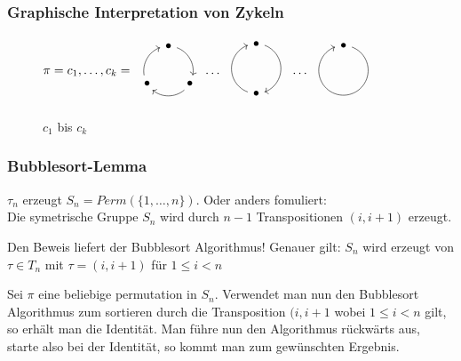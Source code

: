 \documentclass[12pt, german]{article}
\begin{document}
\subsubsection{Graphische Interpretation von Zykeln}
	\begin{figure}[h!]
		\centering
		$ \pi = c_1, \ldots, c_k = \begin{array}{ccc}
		\begin{tikzpicture}[->,scale=.7] 
		\foreach \a/\t in {90/.,-30/.,210/.}{
			\node (\t) at (\a:1cm) {$\bullet$};
			\draw (\a-20:1cm)  arc (\a-20:\a-100:1cm);
		} 
		\end{tikzpicture}
	\end{array} \ldots
	\begin{array}{ccc}
	\begin{tikzpicture}[->,scale=.7] 
	\foreach \a/\t in {90/.,-90/.}{
		\node (\t) at (\a:1cm) {$\bullet$};
		\draw (\a-20:1cm)  arc (\a-20:\a-160:1cm);
	} 
	\end{tikzpicture}
	\end{array}
	\ldots
	\begin{array}{ccc}
	\begin{tikzpicture}[->,scale=.7] 
	\foreach \a/\t in {90/.}{
		\node (\t) at (\a:1cm) {$\bullet$};
		\draw (\a-20:1cm)  arc (\a-20:\a-340:1cm);
	} 
	\end{tikzpicture}
	\end{array}$
	\caption{$c_1$ bis $c_k$}
	\end{figure}

\subsubsection{Bubblesort-Lemma}
		 $\tau_n$ erzeugt $S_n = Perm(\{1, \ldots, n\})$. Oder anders fomuliert: \\
		 Die symetrische Gruppe $S_n$ wird durch $n-1$ Transpositionen $(i, i+1)$ erzeugt.
	 	\newline
	 	
	 	Den Beweis liefert der Bubblesort Algorithmus! 
		Genauer gilt: $S_n$ wird erzeugt von $\tau \in T_n$ mit $\tau= (i, i+1)$ für $1 \leq i < n$
		\newline
			
		Sei $\pi$ eine beliebige permutation in $S_n$. Verwendet man nun den Bubblesort Algorithmus zum sortieren durch die Transposition $(i, i+1$ wobei $1 \leq i <n $ gilt, so erhält man die Identität. Man führe nun den Algorithmus rückwärts aus, starte also bei der Identität, so kommt man zum gewünschten Ergebnis.
\end{document}
